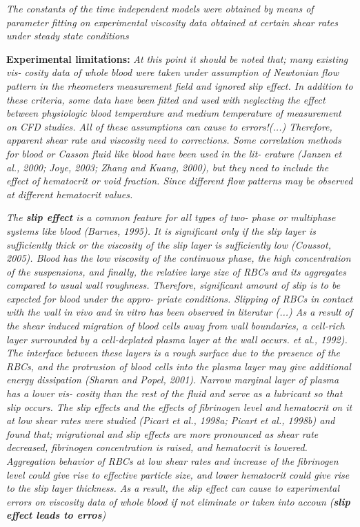\documentclass[11pt,letterpaper]{article}
\begin{document}
\textit{The constants of the time  independent models were obtained by means of parameter  fitting on  experimental viscosity  data obtained  at certain shear  rates under steady  state  conditions}

\textbf{Experimental limitations:}
\textit{At this point it should  be noted  that; many existing vis-
cosity  data of whole blood were taken under assumption of Newtonian flow pattern in  the rheometers measurement field and ignored slip  effect.  In  addition  to these criteria, some data  have been fitted and  used  with neglecting the effect between physiologic blood temperature and medium temperature  of  measurement on CFD studies. All of these assumptions can cause to  errors!(...) Therefore,  apparent  shear rate  and viscosity need to corrections. Some  correlation methods for blood or  Casson  fluid  like blood  have been used  in the lit- erature (Janzen  et al., 2000; Joye, 2003; Zhang and  Kuang, 2000), but  they need to include the  effect  of hematocrit  or void fraction. Since different flow patterns may be observed at different  hematocrit values.}


\textit{The \textbf{slip effect} is  a common  feature  for all types of two- phase or  multiphase systems like  blood (Barnes, 1995).  It is  significant only if  the slip layer is sufficiently thick  or the viscosity of the slip  layer  is sufficiently low  (Coussot, 2005). Blood has the low viscosity of the continuous phase, the high concentration of the  suspensions,  and finally,  the relative large size of RBCs and its aggregates compared to usual wall roughness. Therefore, significant amount of slip is to be expected for blood under the appro- priate  conditions. Slipping of RBCs in  contact with the wall in  vivo and  in vitro  has been  observed in literatur (...) As a  result of  the shear induced migration of blood cells  away from wall boundaries, a cell-rich layer surrounded by a  cell-deplated plasma  layer  at the wall occurs. et al., 1992). The interface between these layers is a  rough surface  due  to the  presence of the  RBCs, and the protrusion of blood cells into the plasma layer  may give additional energy  dissipation (Sharan and Popel, 2001). Narrow marginal layer of plasma has a  lower vis- cosity than the rest  of the fluid and  serve as a  lubricant so that slip occurs. The slip effects and the effects of fibrinogen level and hematocrit  on it  at low shear  rates were studied (Picart  et al., 1998a; Picart  et al., 1998b)  and found that; migrational and  slip effects are more pronounced as shear rate decreased, fibrinogen concentration is raised, and hematocrit is lowered. Aggregation behavior of RBCs at low shear rates and increase  of the fibrinogen level could give rise to effective particle size, and lower hematocrit could give rise to the slip layer thickness. As a result, the slip  effect can  cause to experimental errors on viscosity data of  whole blood if not eliminate or taken into accoun (\textbf{slip effect leads to erros})}
\end{document}
